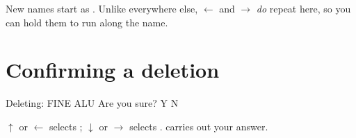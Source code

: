 New names start as . Unlike everywhere else, $\leftarrow$
and $\rightarrow$ \emph{do} repeat here, so you can hold them to run along the
name.

\section{Confirming a deletion}

\begin{lcdscreen}
\begin{lcdverb}
Deleting: FINE ALU
Are you sure?
       Y      N
\end{lcdverb}
\end{lcdscreen}

$\uparrow$ or $\leftarrow$ selects ; $\downarrow$ or $\rightarrow$
selects .  carries out your answer.
